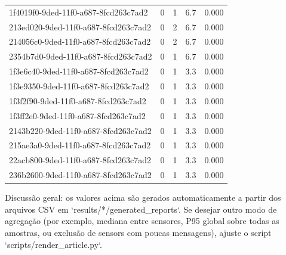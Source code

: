 \begin{longtable}{l r r r r}
1f4019f0-9ded-11f0-a687-8fcd263c7ad2 & 0 & 1 & 6.7 & 0.000 \\

213ed020-9ded-11f0-a687-8fcd263c7ad2 & 0 & 2 & 6.7 & 0.000 \\

214056c0-9ded-11f0-a687-8fcd263c7ad2 & 0 & 2 & 6.7 & 0.000 \\

2354b7d0-9ded-11f0-a687-8fcd263c7ad2 & 0 & 1 & 6.7 & 0.000 \\

1f3e6c40-9ded-11f0-a687-8fcd263c7ad2 & 0 & 1 & 3.3 & 0.000 \\

1f3e9350-9ded-11f0-a687-8fcd263c7ad2 & 0 & 1 & 3.3 & 0.000 \\

1f3f2f90-9ded-11f0-a687-8fcd263c7ad2 & 0 & 1 & 3.3 & 0.000 \\

1f3ff2e0-9ded-11f0-a687-8fcd263c7ad2 & 0 & 1 & 3.3 & 0.000 \\

2143b220-9ded-11f0-a687-8fcd263c7ad2 & 0 & 1 & 3.3 & 0.000 \\

215ae3a0-9ded-11f0-a687-8fcd263c7ad2 & 0 & 1 & 3.3 & 0.000 \\

22acb800-9ded-11f0-a687-8fcd263c7ad2 & 0 & 1 & 3.3 & 0.000 \\

236b2600-9ded-11f0-a687-8fcd263c7ad2 & 0 & 1 & 3.3 & 0.000 \\

\end{longtable}




Discussão geral: os valores acima são gerados automaticamente a partir dos arquivos CSV em `results/*/generated_reports`. Se desejar outro modo de agregação (por exemplo, mediana entre sensores, P95 global sobre todas as amostras, ou exclusão de sensors com poucas mensagens), ajuste o script `scripts/render_article.py`.